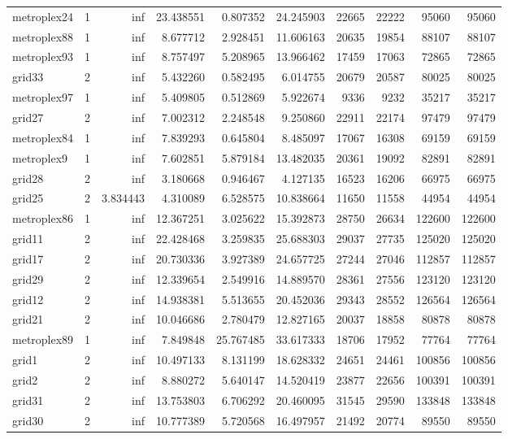 \begin{longtable}{|l|r|r|r|r|r|r|r|r|r|}
metroplex24 & 1 & inf & 23.438551 & 0.807352 & 24.245903 & 22665 & 22222 & 95060 & 95060 \\
metroplex88 & 1 & inf & 8.677712 & 2.928451 & 11.606163 & 20635 & 19854 & 88107 & 88107 \\
metroplex93 & 1 & inf & 8.757497 & 5.208965 & 13.966462 & 17459 & 17063 & 72865 & 72865 \\
grid33 & 2 & inf & 5.432260 & 0.582495 & 6.014755 & 20679 & 20587 & 80025 & 80025 \\
metroplex97 & 1 & inf & 5.409805 & 0.512869 & 5.922674 & 9336 & 9232 & 35217 & 35217 \\
grid27 & 2 & inf & 7.002312 & 2.248548 & 9.250860 & 22911 & 22174 & 97479 & 97479 \\
metroplex84 & 1 & inf & 7.839293 & 0.645804 & 8.485097 & 17067 & 16308 & 69159 & 69159 \\
metroplex9 & 1 & inf & 7.602851 & 5.879184 & 13.482035 & 20361 & 19092 & 82891 & 82891 \\
grid28 & 2 & inf & 3.180668 & 0.946467 & 4.127135 & 16523 & 16206 & 66975 & 66975 \\
grid25 & 2 & 3.834443 & 4.310089 & 6.528575 & 10.838664 & 11650 & 11558 & 44954 & 44954 \\
metroplex86 & 1 & inf & 12.367251 & 3.025622 & 15.392873 & 28750 & 26634 & 122600 & 122600 \\
grid11 & 2 & inf & 22.428468 & 3.259835 & 25.688303 & 29037 & 27735 & 125020 & 125020 \\
grid17 & 2 & inf & 20.730336 & 3.927389 & 24.657725 & 27244 & 27046 & 112857 & 112857 \\
grid29 & 2 & inf & 12.339654 & 2.549916 & 14.889570 & 28361 & 27556 & 123120 & 123120 \\
grid12 & 2 & inf & 14.938381 & 5.513655 & 20.452036 & 29343 & 28552 & 126564 & 126564 \\
grid21 & 2 & inf & 10.046686 & 2.780479 & 12.827165 & 20037 & 18858 & 80878 & 80878 \\
metroplex89 & 1 & inf & 7.849848 & 25.767485 & 33.617333 & 18706 & 17952 & 77764 & 77764 \\
grid1 & 2 & inf & 10.497133 & 8.131199 & 18.628332 & 24651 & 24461 & 100856 & 100856 \\
grid2 & 2 & inf & 8.880272 & 5.640147 & 14.520419 & 23877 & 22656 & 100391 & 100391 \\
grid31 & 2 & inf & 13.753803 & 6.706292 & 20.460095 & 31545 & 29590 & 133848 & 133848 \\
grid30 & 2 & inf & 10.777389 & 5.720568 & 16.497957 & 21492 & 20774 & 89550 & 89550 \\

\end{longtable}
